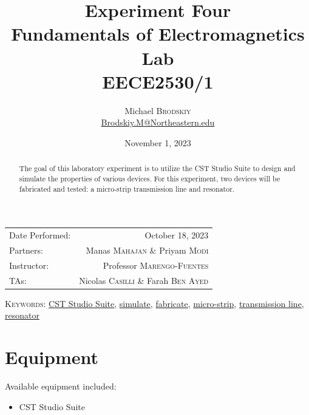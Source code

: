 \documentclass[
	letterpaper, %
	10pt, %
]{CSUniSchoolLabReport}
\title{Experiment Four\\ Fundamentals of Electromagnetics Lab \\ EECE2530/1} %
\author{Michael \textsc{Brodskiy}\\ \small \href{mailto:Brodskiy.M@Northeastern.edu}{Brodskiy.M@Northeastern.edu}}
\date{November 1, 2023} %
\begin{document}
\maketitle %

\begin{center}
	\begin{tabular}{l r}
		Date Performed: & October 18, 2023 \\ %
        Partners: & Manas \textsc{Mahajan} \& Priyam \textsc{Modi} \\ %
		Instructor: & Professor \textsc{Marengo-Fuentes} \\ %
        TAs: & Nicolas \textsc{Casilli} \& Farah \textsc{Ben Ayed} \\ %
	\end{tabular}
\end{center}

\newpage

\begin{abstract}

  The goal of this laboratory experiment is to utilize the CST Studio Suite to design and simulate the properties of various devices. For this experiment, two devices will be fabricated and tested: a micro-strip transmission line and resonator.

\end{abstract}

\begin{flushleft}

  \textsc{Keywords:} \underline{CST Studio Suite}, \underline{simulate}, \underline{fabricate}, \underline{micro-strip}, \underline{transmission line}, \underline{resonator}

\end{flushleft}

\newpage

\section{Equipment}

\hspace{.5 in} Available equipment included:\\

\begin{itemize}

  \item CST Studio Suite

\end{itemize}
\end{document}
